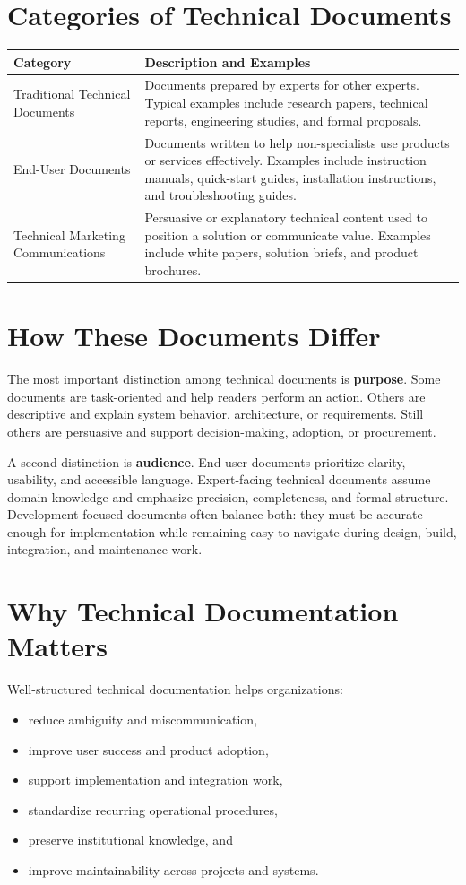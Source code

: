 \documentclass[11pt]{article}
\begin{document}
\section{Categories of Technical Documents}
\begin{tabularx}{\textwidth}{@{}>{\RaggedRight\arraybackslash}p{} >{\RaggedRight\arraybackslash}X@{}}
\toprule
\textbf{Category} & \textbf{Description and Examples} \\
\midrule
Traditional Technical Documents & Documents prepared by experts for other experts. Typical examples include research papers, technical reports, engineering studies, and formal proposals. \\
\addlinespace
End-User Documents & Documents written to help non-specialists use products or services effectively. Examples include instruction manuals, quick-start guides, installation instructions, and troubleshooting guides. \\
\addlinespace
Technical Marketing Communications & Persuasive or explanatory technical content used to position a solution or communicate value. Examples include white papers, solution briefs, and product brochures. \\
\bottomrule
\end{tabularx}

\section{How These Documents Differ}
The most important distinction among technical documents is \textbf{purpose}. Some documents are task-oriented and help readers perform an action. Others are descriptive and explain system behavior, architecture, or requirements. Still others are persuasive and support decision-making, adoption, or procurement.

A second distinction is \textbf{audience}. End-user documents prioritize clarity, usability, and accessible language. Expert-facing technical documents assume domain knowledge and emphasize precision, completeness, and formal structure. Development-focused documents often balance both: they must be accurate enough for implementation while remaining easy to navigate during design, build, integration, and maintenance work.

\section{Why Technical Documentation Matters}
Well-structured technical documentation helps organizations:
\begin{itemize}
  \item reduce ambiguity and miscommunication,
  \item improve user success and product adoption,
  \item support implementation and integration work,
  \item standardize recurring operational procedures,
  \item preserve institutional knowledge, and
  \item improve maintainability across projects and systems.
\end{itemize}
\end{document}
